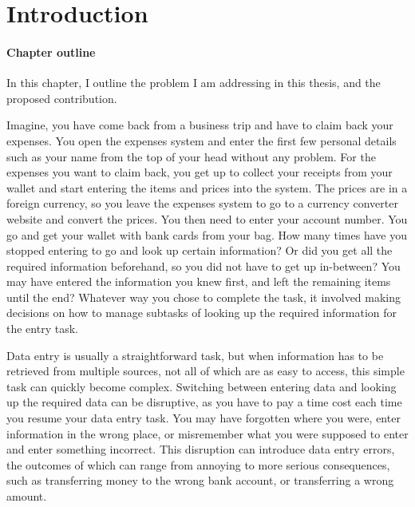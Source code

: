 \chapter{Introduction}

\begin{mynote}
\subsubsection{Chapter outline}
In this chapter, I outline the problem I am addressing in this thesis, and the proposed contribution.
\end{mynote}

\vspace{10pt}
 
Imagine, you have come back from a business trip and have to claim back your expenses. You open the expenses system and enter the first few personal details such as your name from the top of your head without any problem. For the expenses you want to claim back, you get up to collect your receipts from your wallet and start entering the items and prices into the system. The prices are in a foreign currency, so you leave the expenses system to go to a currency converter website and convert the prices. You then need to enter your account number. You go and get your wallet with bank cards from your bag. How many times have you stopped entering to go and look up certain information? Or did you get all the required information beforehand, so you did not have to get up in-between? You may have entered the information you knew first, and left the remaining items until the end? Whatever way you chose to complete the task, it involved making decisions on how to manage subtasks of looking up the required information for the entry task. 

Data entry is usually a straightforward task, but when information has to be retrieved from multiple sources, not all of which are as easy to access, this simple task can quickly become complex. Switching between entering data and looking up the required data can be disruptive, as you have to pay a time cost 
each time you resume your data entry task. You may have forgotten where you were, enter information in the wrong place, or misremember what you were supposed to enter and enter something incorrect. This disruption can introduce data entry errors, the outcomes of which can range from annoying to more serious consequences, such as transferring money to the wrong bank account, or transferring a wrong amount.  


